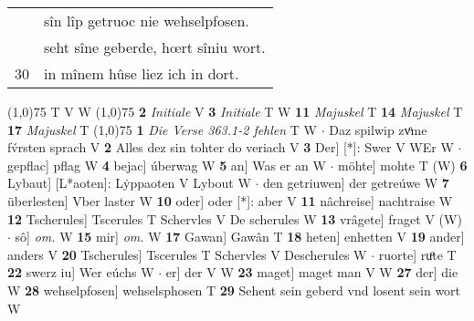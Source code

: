 \documentclass[8pt,a4paper,notitlepage]{article}
\begin{document}
\begin{table}[ht]
\begin{minipage}[t]{0.5\linewidth}
\begin{tabular}{rl}
 & sîn lîp getruoc nie wehselpfosen.\\ 
 & seht sîne geberde, hœrt sîniu wort.\\ 
30 & in mînem hûse liez ich in dort.\\ 
\end{tabular}
\scriptsize
\line(1,0){75} \newline
T V W \newline
\line(1,0){75} \newline
\textbf{2} \textit{Initiale} V  \textbf{3} \textit{Initiale} T W  \textbf{11} \textit{Majuskel} T  \textbf{14} \textit{Majuskel} T  \textbf{17} \textit{Majuskel} T  \newline
\line(1,0){75} \newline
\textbf{1} \textit{Die Verse 363.1-2 fehlen} T W   $\cdot$ Daz spilwip zvͦme fv́rsten sprach V \textbf{2} Alles dez sin tohter do veriach V \textbf{3} Der] [*]: Swer V WEr W  $\cdot$ gepflac] pflag W \textbf{4} bejac] úberwag W \textbf{5} an] Was er an W  $\cdot$ möhte] mohte T (W) \textbf{6} Lybaut] [L*aoten]: Lẏppaoten V Lybout W  $\cdot$ den getriuwen] der getreúwe W \textbf{7} überlesten] Vber laster W \textbf{10} oder] oder [*]: aber V \textbf{11} nâchreise] nachtraise W \textbf{12} Tscherules] Tscerules T Schervles V De scherules W \textbf{13} vrâgete] fraget V (W)  $\cdot$ sô] \textit{om.} W \textbf{15} mir] \textit{om.} W \textbf{17} Gawan] Gawân T \textbf{18} heten] enhetten V \textbf{19} ander] anders V \textbf{20} Tscherules] Tscerules T Schervles V Descherules W  $\cdot$ ruorte] ruͦte T \textbf{22} swerz iu] Wer eúchs W  $\cdot$ er] der V W \textbf{23} maget] maget man V W \textbf{27} der] die W \textbf{28} wehselpfosen] wehselsphosen T \textbf{29} Sehent sein geberd vnd losent sein wort W \newline
\end{minipage}
\end{table}
\end{document}
